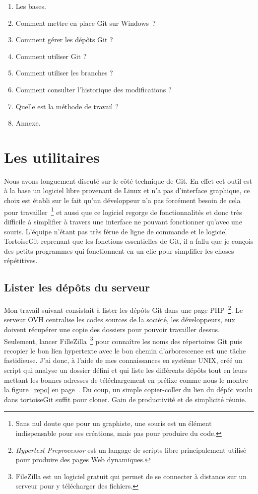 \begin{enumerate}
    \item Les bases.
    \item Comment mettre en place Git sur Windows~\textregistered ?
    \item Comment gérer les dépôts Git ?
    \item Comment utiliser Git ?
    \item Comment utiliser les branches ?
    \item Comment consulter l'historique des modifications ?
    \item Quelle est la méthode de travail ?
    \item Annexe.
\end{enumerate}

\section{Les utilitaires} %
\label{sec:Les utilitaires}
Nous avons longuement discuté sur le côté technique de Git. En effet cet outil
est à la base un logiciel libre provenant de Linux et n'a pas d'interface
graphique, ce choix est établi sur le fait qu'un développeur n'a pas forcément
besoin de cela pour travailler\, \footnote{Sans nul doute que pour un
graphiste, une souris est un élément indispensable pour ses créations, mais pas
pour produire du code.} et aussi que ce logiciel regorge de fonctionnalités et
donc très difficile à simplifier à travers une interface ne pouvant fonctionner
qu'avec une souris. L'équipe n'étant pas très férue de ligne de commande et le
logiciel TortoiseGit reprenant que les fonctions essentielles de Git, il a
fallu que je conçois des petits programmes qui fonctionnent en un clic pour
simplifier les choses répétitives.

\subsection{Lister les dépôts du serveur} %
\label{sub:Lister les dépôts du serveur}

Mon travail suivant consistait à lister les dépôts Git dans une page PHP\,
\footnote{\emph{Hypertext Preprocessor} est un langage de scripts libre
principalement utilisé pour produire des pages Web dynamiques.}. Le serveur OVH
centralise les codes sources de la société, les développeurs, eux doivent
récupérer une copie des dossiers pour pouvoir travailler dessus. Seulement,
lancer FilleZilla\, \footnote{FileZilla est un logiciel gratuit qui permet de
se connecter à distance sur un serveur pour y télécharger des fichiers.} pour
connaître les noms des répertoires Git puis recopier le bon lien hypertexte
avec le bon chemin d'arborescence est une tâche fastidieuse.  J'ai donc, à
l'aide de mes connaissances en système UNIX, créé un script qui analyse un
dossier défini et qui liste les différents dépôts tout en leurs mettant les
bonnes adresses de téléchargement en préfixe comme nous le montre la
figure~\ref{repo} en page~\pageref{repo}. Du coup, un simple copier-coller du
lien du dépôt voulu dans tortoiseGit suffit pour cloner. Gain de productivité
et de simplicité réunie.

